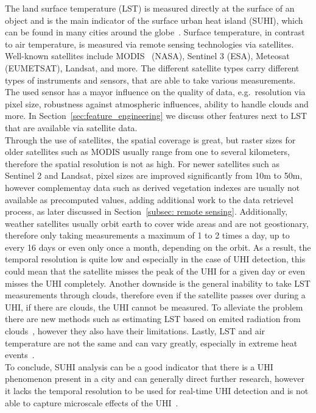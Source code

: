 The land surface temperature (LST) is measured directly at the surface of an object and is the main indicator of the surface urban heat island (SUHI), which can be found in many cities around the globe~\cite{peng2012surface}. Surface temperature, in contrast to air temperature, is measured via remote sensing technologies via satellites. Well-known satellites include MODIS~\cite{didan2021modis} (NASA), Sentinel 3 (ESA), Meteosat (EUMETSAT), Landsat, and more. The different satellite types carry different types of instruments and sensors, that are able to take various measurements. The used sensor has a mayor influence on the quality of data, e.g.\ resolution via pixel size, robustness against atmospheric influences, ability to handle clouds and more. In Section~\ref{sec:feature_engineering} we discuss other features next to LST that are available via satellite data.\\
Through the use of satellites, the spatial coverage is great, but raster sizes for older satellites such as MODIS usually range from one to several kilometers, therefore the spatial resolution is not as high. For newer satellites such as Sentinel 2 and Landsat, pixel sizes are improved significantly from 10m to 50m, however complementay data such as derived vegetation indexes are usually not available as precomputed values, adding additional work to the data retrievel process, as later discussed in Section~\ref{subsec: remote sensing}.
Additionally, weather satellites usually orbit earth to cover wide areas and are not geostionary, therefore only taking measurements a maximum of 1 to 2 times a day, up to every 16 days or even only once a month, depending on the orbit. As a result, the temporal resolution is quite low and especially in the case of UHI detection, this could mean that the satellite misses the peak of the UHI for a given day or even misses the UHI completely. Another downside is the general inability to take LST measurements through clouds, therefore even if the satellite passes over during a UHI, if there are clouds, the UHI cannot be measured. To alleviate the problem there are new methods such as estimating LST based on emited radiation from clouds~\cite{zhang2015estimation}, however they also have their limitations. Lastly, LST and air temperature are not the same and can vary greatly, especially in extreme heat events~\cite{good2016situ}.\\
To conclude, SUHI analysis can be a good indicator that there is a UHI phenomenon present in a city and can generally direct further research, however it lacks the temporal resolution to be used for real-time UHI detection and is not able to capture microscale effects of the UHI~\cite{voogt2003thermal, voelkel2017towards}.

